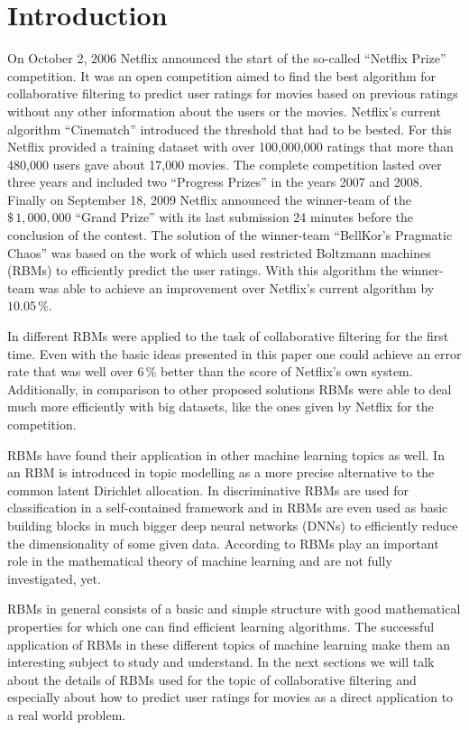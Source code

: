 \documentclass[crop=false,10pt]{standalone}
\begin{document}
  \section{Introduction} %
  \label{sec:introduction}
    On October 2, 2006 Netflix announced the start of the so-called \enquote{Netflix Prize} competition.
    It was an open competition aimed to find the best algorithm for collaborative filtering to predict user ratings for movies based on previous ratings without any other information about the users or the movies.
    Netflix's current algorithm \enquote{Cinematch} introduced the threshold that had to be bested.
    For this Netflix provided a training dataset with over 100,000,000 ratings that more than 480,000 users gave about 17,000 movies.
    The complete competition lasted over three years and included two \enquote{Progress Prizes} in the years 2007 and 2008.
    Finally on September 18, 2009 Netflix announced the winner-team of the $\$\, 1,000,000$ \enquote{Grand Prize} with its last submission 24 minutes before the conclusion of the contest.
    The solution of the winner-team \enquote{BellKor's Pragmatic Chaos} was based on the work of \cite{Hinton2007} which used restricted Boltzmann machines (RBMs) to efficiently predict the user ratings.
    With this algorithm the winner-team was able to achieve an improvement over Netflix's current algorithm by $10.05\,\%$.
    \cite{Hinton2007,NetflixPrize,NetflixPrizeDataset}

    In \cite{Hinton2007} different RBMs were applied to the task of collaborative filtering for the first time.
    Even with the basic ideas presented in this paper one could achieve an error rate that was well over $6\,\%$ better than the score of Netflix's own system.
    Additionally, in comparison to other proposed solutions RBMs were able to deal much more efficiently with big datasets, like the ones given by Netflix for the competition.
    \cite{Hinton2007}

    RBMs have found their application in other machine learning topics as well.
    In \cite{Murphy2012} an RBM is introduced in topic modelling as a more precise alternative to the common latent Dirichlet allocation.
    In \cite{Larochelle2008} discriminative RBMs are used for classification in a self-contained framework and in \cite{Hinton2006} RBMs are even used as basic building blocks in much bigger deep neural networks (DNNs) to efficiently reduce the dimensionality of some given data.
    According to \cite{Montufar2018} RBMs play an important role in the mathematical theory of machine learning and are not fully investigated, yet.

    RBMs in general consists of a basic and simple structure with good mathematical properties for which one can find efficient learning algorithms.
    The successful application of RBMs in these different topics of machine learning make them an interesting subject to study and understand.
    In the next sections we will talk about the details of RBMs used for the topic of collaborative filtering and especially about how to predict user ratings for movies as a direct application to a real world problem.
\end{document}

